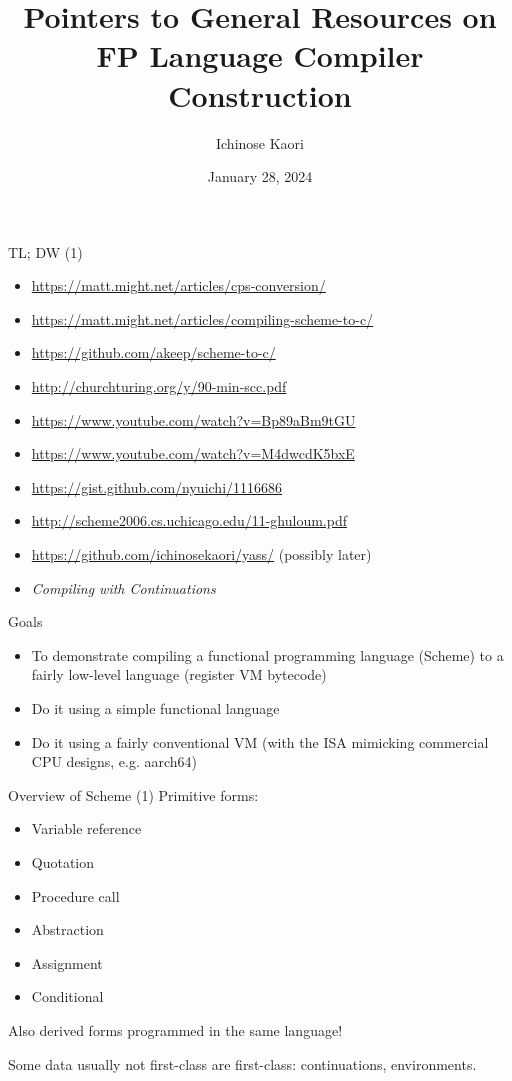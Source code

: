 \documentclass{beamer}
\title[FP Compilers]{Pointers to General Resources on FP Language Compiler Construction}
\author{Ichinose Kaori}
\date{January 28, 2024}
\begin{document}
\maketitle

\begin{frame}{TL; DW (1)}
  \begin{itemize}
  \item \url{https://matt.might.net/articles/cps-conversion/}
  \item \url{https://matt.might.net/articles/compiling-scheme-to-c/}
  \item \url{https://github.com/akeep/scheme-to-c/}
  \item \url{http://churchturing.org/y/90-min-scc.pdf}
  \item \url{https://www.youtube.com/watch?v=Bp89aBm9tGU}
  \item \url{https://www.youtube.com/watch?v=M4dwcdK5bxE}
  \item \url{https://gist.github.com/nyuichi/1116686}
  \item \url{http://scheme2006.cs.uchicago.edu/11-ghuloum.pdf}
  \item \url{https://github.com/ichinosekaori/yass/} (possibly later)
  \item \textit{Compiling with Continuations}
  \end{itemize}
\end{frame}

\begin{frame}{Goals}
  \begin{itemize}
    \item To demonstrate compiling a functional programming language (Scheme) to a fairly low-level language (register VM bytecode)
    \item Do it using a simple functional language
    \item Do it using a fairly conventional VM (with the ISA mimicking commercial CPU designs, e.g. aarch64)
  \end{itemize}
\end{frame}

\begin{frame}{Overview of Scheme (1)}
  Primitive forms:
  \begin{itemize}
  \item Variable reference
  \item Quotation
  \item Procedure call
  \item Abstraction
  \item Assignment
  \item Conditional
  \end{itemize}

  Also derived forms programmed in the same language!

  Some data usually not first-class are first-class: continuations, environments. 
\end{frame}
\end{document}
